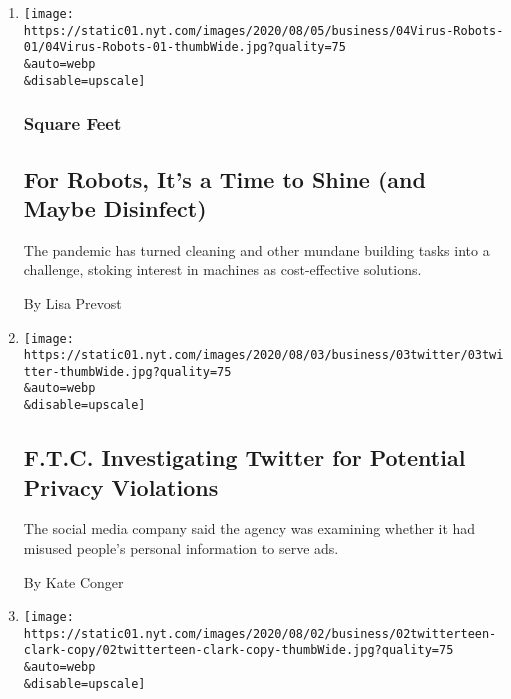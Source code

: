 \begin{enumerate}
\def\labelenumi{\arabic{enumi}.}
\item
  \href{/2020/08/04/business/robot-cleaning-coronavirus.html}{}

  \texttt{[image: https://static01.nyt.com/images/2020/08/05/business/04Virus-Robots-01/04Virus-Robots-01-thumbWide.jpg?quality=75\\\&auto=webp\\\&disable=upscale]}

  \hypertarget{square-feet}{%
  \subsubsection{Square Feet}\label{square-feet}}

  \hypertarget{for-robots-its-a-time-to-shine-and-maybe-disinfect}{%
  \subsection{For Robots, It's a Time to Shine (and Maybe
  Disinfect)}\label{for-robots-its-a-time-to-shine-and-maybe-disinfect}}

  The pandemic has turned cleaning and other mundane building tasks into
  a challenge, stoking interest in machines as cost-effective solutions.

  By Lisa Prevost
\item
  \href{/2020/08/03/technology/ftc-twitter-privacy-violations.html}{}

  \texttt{[image: https://static01.nyt.com/images/2020/08/03/business/03twitter/03twitter-thumbWide.jpg?quality=75\\\&auto=webp\\\&disable=upscale]}

  \hypertarget{ftc-investigating-twitter-for-potential-privacy-violations}{%
  \subsection{F.T.C. Investigating Twitter for Potential Privacy
  Violations}\label{ftc-investigating-twitter-for-potential-privacy-violations}}

  The social media company said the agency was examining whether it had
  misused people's personal information to serve ads.

  By Kate Conger
\item
  \href{/2020/08/02/technology/florida-teenager-twitter-hack.html}{}

  \texttt{[image: https://static01.nyt.com/images/2020/08/02/business/02twitterteen-clark-copy/02twitterteen-clark-copy-thumbWide.jpg?quality=75\\\&auto=webp\\\&disable=upscale]}


\end{enumerate}
